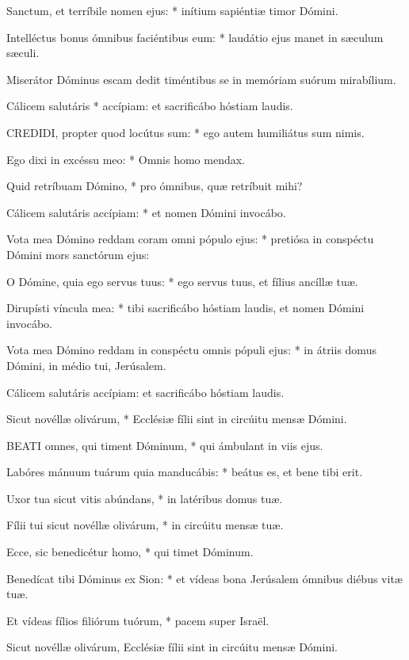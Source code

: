 Sanctum, et terríbile nomen ejus: * inítium sapiéntiæ timor Dómini.

Intelléctus bonus ómnibus faciéntibus eum: * laudátio ejus manet in sæculum sæculi.

 Miserátor Dóminus escam dedit timéntibus se in memóriam suórum mirabílium.

 Cálicem salutáris * accípiam: et sacrificábo hóstiam laudis.


\lettrine[lines=2]{C}{REDIDI}, propter quod locútus sum: * ego autem humiliátus sum nimis.

Ego dixi in excéssu meo: * Omnis homo mendax.

Quid retríbuam Dómino, * pro ómnibus, quæ retríbuit mihi?

Cálicem salutáris accípiam: * et nomen Dómini invocábo.

Vota mea Dómino reddam coram omni pópulo ejus: * pretiósa in conspéctu Dómini mors sanctórum ejus:

O Dómine, quia ego servus tuus: * ego servus tuus, et fílius ancíllæ tuæ.

Dirupísti víncula mea: * tibi sacrificábo hóstiam laudis, et nomen Dómini invocábo.

Vota mea Dómino reddam in conspéctu omnis pópuli ejus: * in átriis domus Dómini, in médio tui, Jerúsalem.

 Cálicem salutáris accípiam: et sacrificábo hóstiam laudis.

 Sicut novéllæ olivárum, * Ecclésiæ fílii sint in circúitu mensæ Dómini.


\lettrine[lines=2]{B}{EATI} omnes, qui timent Dóminum, * qui ámbulant in viis ejus.

Labóres mánuum tuárum quia manducábis: * beátus es, et bene tibi erit.

Uxor tua sicut vitis abúndans, * in latéribus domus tuæ.

Fílii tui sicut novéllæ olivárum, * in circúitu mensæ tuæ.

Ecce, sic benedicétur homo, * qui timet Dóminum.

Benedícat tibi Dóminus ex Sion: * et vídeas bona Jerúsalem ómnibus diébus vitæ tuæ.

Et vídeas fílios filiórum tuórum, * pacem super Israël.

 Sicut novéllæ olivárum, Ecclésiæ fílii sint in circúitu mensæ Dómini.

